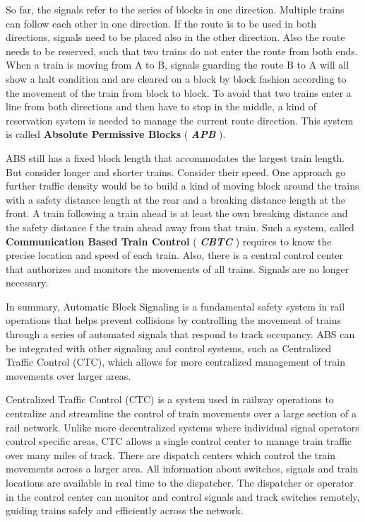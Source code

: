 \begin{center}
\end{center}


So far, the signals refer to the series of blocks in one direction. Multiple trains can follow each other in one direction. If the route is to be used in both directions, signals need to be placed also in the other direction. Also the route needs to be reserved, such that two trains do not enter the route from both ends. When a train is moving from A to B, signals guarding the route B to A will all show a halt condition and are cleared on a block by block fashion according to the movement of the train from block to block. To avoid that two trains enter a line from both directions and then have to stop in the middle, a kind of reservation system is needed to manage the current route direction. This system is called \textbf{Absolute Permissive Blocks} ( \textbf{\textit{APB}} ).

ABS still has a fixed block length that accommodates the largest train length. But consider longer and shorter trains. Consider their speed. One approach go further traffic density would be to build a kind of moving block around the trains with a safety distance length at the rear and a breaking distance length at the front. A train following a train ahead is at least the own breaking distance and the safety distance f the train ahead away from that train. Such a system, called \textbf{Communication Based Train Control} ( \textbf{\textit{CBTC}} ) requires to know the precise location and speed of each train. Also, there is a central control center that authorizes and monitors the movements of all trains. Signals are no longer necessary.

In summary, Automatic Block Signaling is a fundamental safety system in rail operations that helps prevent collisions by controlling the movement of trains through a series of automated signals that respond to track occupancy. ABS can be integrated with other signaling and control systems, such as Centralized Traffic Control (CTC), which allows for more centralized management of train movements over larger areas.


Centralized Traffic Control (CTC) is a system used in railway operations to centralize and streamline the control of train movements over a large section of a rail network. Unlike more decentralized systems where individual signal operators control specific areas, CTC allows a single control center to manage train traffic over many miles of track. There are dispatch centers which control the train movements across a larger area. All information about switches, signals and train locations are available in real time to the dispatcher. The dispatcher or operator in the control center can monitor and control signals and track switches remotely, guiding trains safely and efficiently across the network.

